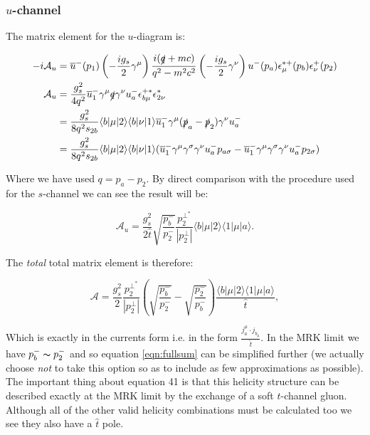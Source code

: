		\subsubsection{$u$-channel}

		The matrix element for the $u$-diagram is:

			\begin{equation}
			\begin{split}
			-i\mathcal{A}_u &= \overline{u}^-(p_1)\left(-\frac{ig_s}{2}\gamma^\mu\right)\frac{i(\slashed q+mc)}{q^2-m^2c^2}\left(-\frac{ig_s}{2}\gamma^\nu\right)u^-(p_a)\epsilon_\mu^{*+}(p_b)\epsilon^+_\nu(p_2)\\
			\mathcal{A}_u &= \frac{g_s^2}{4q^2}\overline{u}^-_1\gamma^\mu\slashed q\gamma^\nu u^-_a\epsilon^{+*}_{b\mu}\epsilon^*_{2\nu}\\
			&= \frac{g_s^2}{8q^2s_{2b}}\langle b|\mu|2\rangle\langle b|\nu|1\rangle\overline{u}^-_1\gamma^\mu(\slashed{p}_a-\slashed{p}_2)\gamma^\nu u^-_a\\
			&= \frac{g_s^2}{8q^2s_{2b}}\langle b|\mu|2\rangle\langle b|\nu|1\rangle(\overline{u}^-_1\gamma^\mu\gamma^\sigma\gamma^\nu u^-_ap_{a\sigma} - \overline{u}^-_1\gamma^\mu\gamma^\sigma \gamma^\nu u^-_ap_{2\sigma})
			\end{split}
			\end{equation}

			Where we have used $q=p_a-p_2$.  By direct comparison with the procedure used for the $s$-channel we can see the result will be:

			\begin{equation}
			\mathcal{A}_u=\frac{g_s^2}{2\hat{t}}\sqrt{\frac{p_b^-}{p_2^-}}\frac{p_2^{\perp^*}}{|p_2^\perp|}\langle{b}|\mu|2\rangle\langle{1}|\mu|a\rangle.
			\end{equation}

			The \emph{total} total matrix element is therefore:

			\begin{equation}
			\mathcal{A}=\frac{g_s^2}{2}\frac{p_2^{\perp^*}}{|p_2^\perp|}\left(\sqrt{\frac{p_b^-}{p_2^-}}-\sqrt{\frac{p_2^-}{p_b^-}}\right)\frac{\langle{b}|\mu|2\rangle\langle{1}|\mu|a\rangle}{\hat{t}},
			\label{eqn:fullsum}
			\end{equation}

			Which is exactly in the currents form i.e. in the form $\frac{j_a^\mu\cdot j_{b_\mu}}{\hat{t}}$.  In the MRK
			limit we have $p_b^-\thicksim p_2^-$ and so equation \ref{eqn:fullsum} can be simplified further (we actually
			choose \emph{not} to take this option so as to include as few approximations as possible).  The important
			thing about equation 41 is that this helicity structure can be described exactly at the MRK limit by the
			exchange of a soft $t$-channel gluon.  Although all of the other valid helicity combinations must be
			calculated too we see they also have a $\hat t$ pole.

